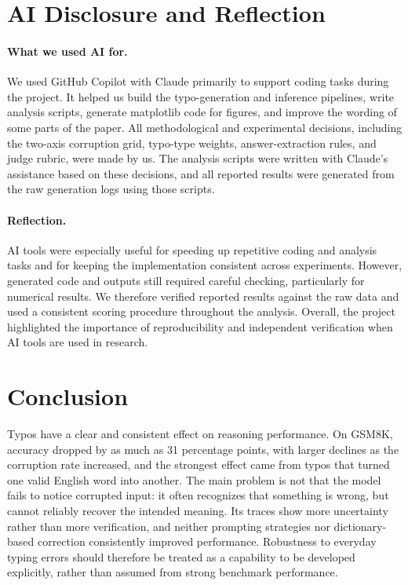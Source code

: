 \documentclass[11pt]{article}
\begin{document}
\section{AI Disclosure and Reflection}

\paragraph{What we used AI for.}
We used GitHub Copilot with Claude primarily to support coding tasks during the
project. It helped us build the typo-generation and inference pipelines, write
analysis scripts, generate matplotlib code for figures, and improve the wording
of some parts of the paper. All methodological and experimental decisions,
including the two-axis corruption grid, typo-type weights, answer-extraction
rules, and judge rubric, were made by us. The analysis scripts were written with
Claude's assistance based on these decisions, and all reported results were
generated from the raw generation logs using those scripts.

\paragraph{Reflection.}
AI tools were especially useful for speeding up repetitive coding and analysis
tasks and for keeping the implementation consistent across experiments. However,
generated code and outputs still required careful checking, particularly for
numerical results. We therefore verified reported results against the raw data
and used a consistent scoring procedure throughout the analysis. Overall, the
project highlighted the importance of reproducibility and independent
verification when AI tools are used in research.

\section{Conclusion}

Typos have a clear and consistent effect on reasoning performance. On GSM8K,
accuracy dropped by as much as 31 percentage points, with larger declines as the
corruption rate increased, and the strongest effect came from typos that turned
one valid English word into another. The main problem is not that the model
fails to notice corrupted input: it often recognizes that something is wrong,
but cannot reliably recover the intended meaning. Its traces show more
uncertainty rather than more verification, and neither prompting strategies nor
dictionary-based correction consistently improved performance. Robustness to
everyday typing errors should therefore be treated as a capability to be
developed explicitly, rather than assumed from strong benchmark performance.
\end{document}
